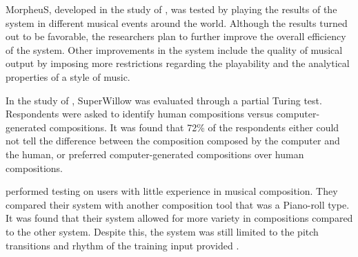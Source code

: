 
MorpheuS, developed in the study of \citet{herremans2016morpheus}, was tested by playing the results of the system in different musical events around the world. Although the results turned out to be favorable, the researchers plan to further improve the overall efficiency of the system. Other improvements in the system include the quality of musical output by imposing more restrictions regarding the playability and the analytical properties of a style of music.

In the study of \citet{schulze2011music}, SuperWillow was evaluated through a partial Turing test. Respondents were asked to identify human compositions versus computer-generated compositions. It was found that 72\% of the respondents either could not tell the difference between the composition composed by the computer and the human, or preferred computer-generated compositions over human compositions.

\citet{kikuchi2016music} performed testing on users with little experience in musical composition. They compared their system with another composition tool that was a Piano-roll type. It was found that their system allowed for more variety in compositions compared to the other system. Despite this, the system was still limited to the pitch transitions and rhythm of the training input provided \citep{kikuchi2016music}.


